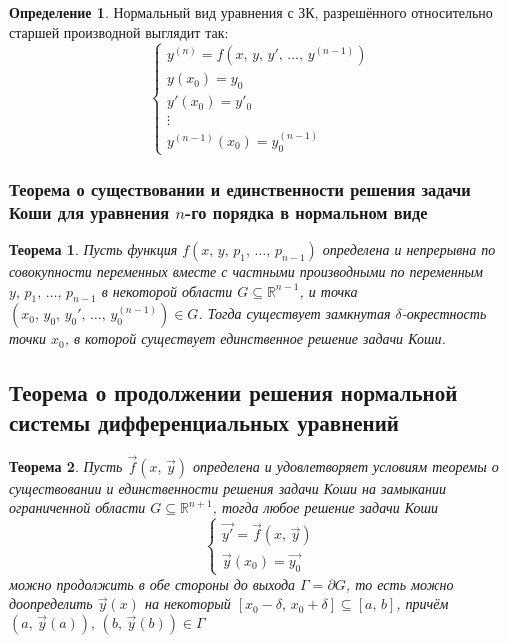 \documentclass[a4paper,12pt]{article}
\theoremstyle{plain}
\newtheorem{theorem}{Теорема}[section]
\theoremstyle{definition}
\newtheorem{definition}{Определение}[section]
\theoremstyle{remark}
\begin{document}
\begin{definition}
	Нормальный вид уравнения с ЗК, разрешённого относительно старшей производной выглядит так:
	\[
		\begin{cases}
			y^{(n)} = f(x,\,y,\,y',\,\ldots,\,y^{(n-1)}) \\
			y(x_0) = y_0                                 \\
			y'(x_0) = y'_0                               \\
			\vdots                                       \\
			y^{(n - 1)}(x_0) = y^{(n-1)}_0
		\end{cases}
	\]
\end{definition}

\subsubsection*{Теорема о существовании и единственности решения задачи Коши для уравнения $n$-го порядка в нормальном виде}
\begin{theorem}
	Пусть функция $f(x,\,y,\,p_1,\,\ldots,\,p_{n-1})$ определена и непрерывна по совокупности переменных вместе с частными производными по переменным $y,\,p_1,\,\ldots,\,p_{n - 1}$ в некоторой области $G \subseteq \mathbb{R}^{n - 1}$, и точка $(x_0,\,y_0,\,y_0',\,\ldots,\,y^{(n-1)}_0) \in G$. Тогда существует замкнутая $\delta$-окрестность точки $x_0$, в которой существует единственное решение задачи Коши.
\end{theorem}

\subsection{Теорема о продолжении решения нормальной системы дифференциальных уравнений}
\begin{theorem}
	Пусть $\vec{f}(x,\,\vec{y})$ определена и удовлетворяет условиям теоремы о существовании и единственности решения задачи Коши на замыкании ограниченной области $G \subseteq \mathbb{R}^{n + 1}$, тогда любое решение задачи Коши
	\[
		\begin{cases}
			\vec{y'} = \vec{f}(x,\,\vec{y}) \\
			\vec{y}(x_0) = \vec{y_0}
		\end{cases}
	\]
	можно продолжить в обе стороны до выхода $\Gamma = \partial G$, то есть можно доопределить $\vec{y}(x)$ на некоторый $[x_0 - \delta,\,x_0 + \delta] \subseteq [a,\,b]$, причём $(a,\,\vec{y}(a)),\, (b,\,\vec{y}(b)) \in \Gamma$
\end{theorem}
\end{document}
